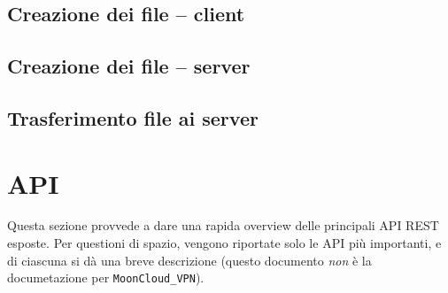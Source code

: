 \subsection{Creazione dei file -- client}

\subsection{Creazione dei file -- server}

\subsection{Trasferimento file ai server}

\section{API}
Questa sezione provvede a dare una rapida overview delle principali API REST
esposte. Per questioni di spazio, vengono riportate solo le API più importanti,
e di ciascuna si dà una breve descrizione (questo documento \textit{non} è
la documetazione per \texttt{MoonCloud\_VPN}).
